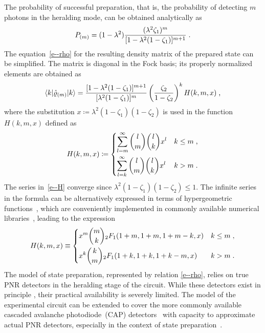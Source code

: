 \documentclass{article}
\begin{document}
The probability of successful preparation, that is, the probability of detecting $m$ photons in the heralding mode, can be obtained analytically as
%
\begin{equation}\label{e-pnr-pro}
  P_{(m)} = (1 - \lambda^{2}) 
  \frac
    { (\lambda^{2} \zeta_{1})^{m} }
    { [ 1 - \lambda^{2} (1 - \zeta_{1}) ]^{m + 1} } \;\text{.}
\end{equation}
%
The equation~\eqref{e--rho} for the resulting density matrix of the prepared state can be simplified. The matrix is diagonal in the Fock basis; its properly normalized elements are obtained as
%
\begin{equation}\label{e-pnr-rho}
  \braket{ k | \hat{\varrho}_{(m)} | k } =
  \frac
    { [ 1 - \lambda^{2} (1 - \zeta_{1}) ]^{m + 1} }
    { [ \lambda^{2} (1 - \zeta_{1}) ]^{m} }
  \left( \frac{ \zeta_{2} }{ 1 - \zeta_{2} } \right)^{k}
  H (k, m, x) \;\text{,}
\end{equation}
%
where the substitution ${x \coloneqq \lambda^{2} ( 1 - \zeta_{1} )(1 - \zeta_{2} )}$ is used in the function $H(k, m, x)$ defined as
%
\begin{equation}\label{e--H}
  H(k, m, x) \coloneq
  \begin{dcases}
    \sum_{l = m}^{\infty}
      \binom{l}{m}
      \binom{l}{k}
      x^{l} 
    & k \leq m \;\text{,} \\
    \sum_{l = k}^{\infty}
      \binom{l}{m}
      \binom{l}{k}
      x^{l}
    & k > m \;\text{.}
  \end{dcases}
\end{equation}
%
The series in~\eqref{e--H} converge since ${\lambda^{2} ( 1 - \zeta_{1} )(1 - \zeta_{2} ) \leq 1}$. The infinite series in the formula can be alternatively expressed in terms of hypergeometric functions~\cite{bateman1981}, which are conveniently implemented in commonly available numerical libraries~\cite{virtanen2020}, leading to the expression
%
\begin{equation}
  H(k, m, x) \equiv
  \begin{dcases}
    x^{m} \binom{m}{k} {}_{2}F_{1} (1 + m, 1 + m, 1 + m - k, x)
    & k \leq m \;\text{,} \\
    x^{k} \binom{k}{m} {}_{2}F_{1} (1 + k, 1 + k, 1 + k - m, x)
    & k > m \;\text{.}
  \end{dcases}
\end{equation}
%
The model of state preparation, represented by relation \eqref{e--rho}, relies on true PNR detectors in the heralding stage of the circuit. While these detectors exist in principle \cite{hopker2019,endo2021,endo2024}, their practical availability is severely limited. The model of the experimental circuit can be extended to cover the more commonly available cascaded avalanche photodiode~(CAP) detectors~\cite{hlousek2019,grygar2022,hlousek2024,ercolano2024} with capacity to approximate actual PNR detectors, especially in the context of state preparation~\cite{provaznik2020}.
\end{document}
